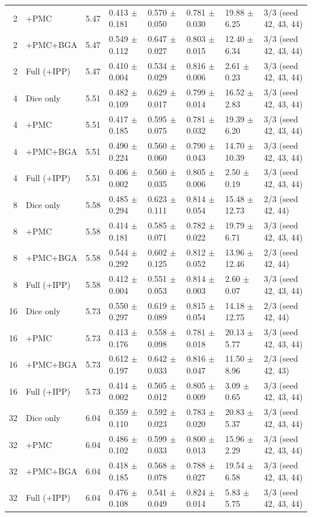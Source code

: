 \documentclass[10pt]{article}
\begin{document}
\begin{landscape}
{\begin{longtable}{r l r l l l l l}
2 & +PMC & 5.47 & 0.413 $\pm$ 0.181 & 0.570 $\pm$ 0.050 & 0.781 $\pm$ 0.030 & 19.88 $\pm$ 6.25 & 3/3 (seed 42, 43, 44) \\
2 & +PMC+BGA & 5.47 & 0.549 $\pm$ 0.112 & 0.647 $\pm$ 0.027 & 0.803 $\pm$ 0.015 & 12.40 $\pm$ 6.34 & 3/3 (seed 42, 43, 44) \\
2 & Full (+IPP) & 5.47 & 0.410 $\pm$ 0.004 & 0.534 $\pm$ 0.029 & 0.816 $\pm$ 0.006 & 2.61 $\pm$ 0.23 & 3/3 (seed 42, 43, 44) \\
4 & Dice only & 5.51 & 0.482 $\pm$ 0.109 & 0.629 $\pm$ 0.017 & 0.799 $\pm$ 0.014 & 16.52 $\pm$ 2.83 & 3/3 (seed 42, 43, 44) \\
4 & +PMC & 5.51 & 0.417 $\pm$ 0.185 & 0.595 $\pm$ 0.075 & 0.781 $\pm$ 0.032 & 19.39 $\pm$ 6.20 & 3/3 (seed 42, 43, 44) \\
4 & +PMC+BGA & 5.51 & 0.490 $\pm$ 0.224 & 0.560 $\pm$ 0.060 & 0.790 $\pm$ 0.043 & 14.70 $\pm$ 10.39 & 3/3 (seed 42, 43, 44) \\
4 & Full (+IPP) & 5.51 & 0.406 $\pm$ 0.002 & 0.560 $\pm$ 0.035 & 0.805 $\pm$ 0.006 & 2.50 $\pm$ 0.19 & 3/3 (seed 42, 43, 44) \\
8 & Dice only & 5.58 & 0.485 $\pm$ 0.294 & 0.623 $\pm$ 0.111 & 0.814 $\pm$ 0.054 & 15.48 $\pm$ 12.73 & 2/3 (seed 42, 44) \\
8 & +PMC & 5.58 & 0.414 $\pm$ 0.181 & 0.585 $\pm$ 0.071 & 0.782 $\pm$ 0.022 & 19.79 $\pm$ 6.71 & 3/3 (seed 42, 43, 44) \\
8 & +PMC+BGA & 5.58 & 0.544 $\pm$ 0.292 & 0.602 $\pm$ 0.125 & 0.812 $\pm$ 0.052 & 13.96 $\pm$ 12.46 & 2/3 (seed 42, 44) \\
8 & Full (+IPP) & 5.58 & 0.412 $\pm$ 0.004 & 0.551 $\pm$ 0.053 & 0.814 $\pm$ 0.003 & 2.60 $\pm$ 0.07 & 3/3 (seed 42, 43, 44) \\
16 & Dice only & 5.73 & 0.550 $\pm$ 0.297 & 0.619 $\pm$ 0.089 & 0.815 $\pm$ 0.054 & 14.18 $\pm$ 12.75 & 2/3 (seed 42, 44) \\
16 & +PMC & 5.73 & 0.413 $\pm$ 0.176 & 0.558 $\pm$ 0.098 & 0.781 $\pm$ 0.018 & 20.13 $\pm$ 5.77 & 3/3 (seed 42, 43, 44) \\
16 & +PMC+BGA & 5.73 & 0.612 $\pm$ 0.197 & 0.642 $\pm$ 0.033 & 0.816 $\pm$ 0.047 & 11.50 $\pm$ 8.96 & 2/3 (seed 42, 43) \\
16 & Full (+IPP) & 5.73 & 0.414 $\pm$ 0.002 & 0.505 $\pm$ 0.012 & 0.805 $\pm$ 0.009 & 3.09 $\pm$ 0.65 & 3/3 (seed 42, 43, 44) \\
32 & Dice only & 6.04 & 0.359 $\pm$ 0.110 & 0.592 $\pm$ 0.023 & 0.783 $\pm$ 0.020 & 20.83 $\pm$ 5.37 & 3/3 (seed 42, 43, 44) \\
32 & +PMC & 6.04 & 0.486 $\pm$ 0.102 & 0.599 $\pm$ 0.033 & 0.800 $\pm$ 0.013 & 15.96 $\pm$ 2.29 & 3/3 (seed 42, 43, 44) \\
32 & +PMC+BGA & 6.04 & 0.418 $\pm$ 0.185 & 0.568 $\pm$ 0.078 & 0.788 $\pm$ 0.027 & 19.54 $\pm$ 6.58 & 3/3 (seed 42, 43, 44) \\
32 & Full (+IPP) & 6.04 & 0.476 $\pm$ 0.108 & 0.541 $\pm$ 0.049 & 0.824 $\pm$ 0.014 & 5.83 $\pm$ 5.75 & 3/3 (seed 42, 43, 44) \\
\end{longtable}
}


\end{landscape}
\end{document}
